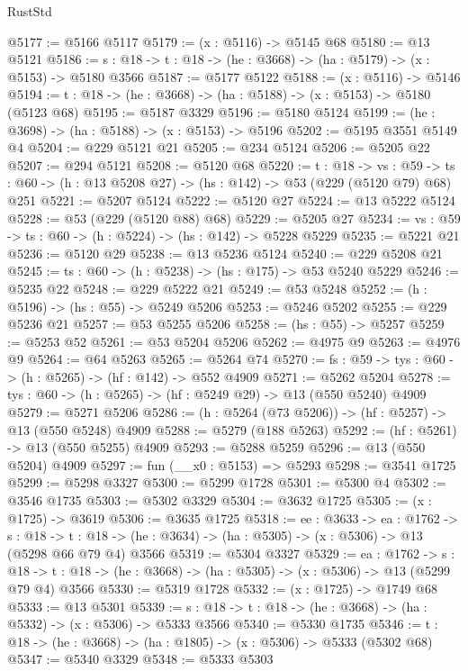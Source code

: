 \begin{lexlean}{RustStd}
\begin{coremodule}
@5177 := @5166 @5117
@5179 := (x : @5116) -> @5145 @68
@5180 := @13 @5121
@5186 := {s : @18} -> {t : @18} -> (he : @3668) -> (ha : @5179) -> (x : @5153) -> @5180 @3566
@5187 := @5177 @5122
@5188 := (x : @5116) -> @5146
@5194 := {t : @18} -> (he : @3668) -> (ha : @5188) -> (x : @5153) -> @5180 (@5123 @68)
@5195 := @5187 @3329
@5196 := @5180 @5124
@5199 := (he : @3698) -> (ha : @5188) -> (x : @5153) -> @5196
@5202 := @5195 @3551 @5149 @4
@5204 := @229 @5121 @21
@5205 := @234 @5124
@5206 := @5205 @22
@5207 := @294 @5121
@5208 := @5120 @68
@5220 := {t : @18} ->
  {vs : @59} -> {ts : @60} -> (h : @13 @5208 @27) -> (hs : @142) -> @53 (@229 (@5120 @79) @68) @251
@5221 := @5207 @5124
@5222 := @5120 @27
@5224 := @13 @5222 @5124
@5228 := @53 (@229 (@5120 @88) @68)
@5229 := @5205 @27
@5234 := {vs : @59} -> {ts : @60} -> (h : @5224) -> (hs : @142) -> @5228 @5229
@5235 := @5221 @21
@5236 := @5120 @29
@5238 := @13 @5236 @5124
@5240 := @229 @5208 @21
@5245 := {ts : @60} -> (h : @5238) -> (hs : @175) -> @53 @5240 @5229
@5246 := @5235 @22
@5248 := @229 @5222 @21
@5249 := @53 @5248
@5252 := (h : @5196) -> (hs : @55) -> @5249 @5206
@5253 := @5246 @5202
@5255 := @229 @5236 @21
@5257 := @53 @5255 @5206
@5258 := (hs : @55) -> @5257
@5259 := @5253 @52
@5261 := @53 @5204 @5206
@5262 := @4975 @9
@5263 := @4976 @9
@5264 := @64 @5263
@5265 := @5264 @74
@5270 := {fs : @59} -> {tys : @60} -> (h : @5265) -> (hf : @142) -> @552 @4909
@5271 := @5262 @5204
@5278 := {tys : @60} -> (h : @5265) -> (hf : @5249 @29) -> @13 (@550 @5240) @4909
@5279 := @5271 @5206
@5286 := (h : @5264 (@73 @5206)) -> (hf : @5257) -> @13 (@550 @5248) @4909
@5288 := @5279 (@188 @5263)
@5292 := (hf : @5261) -> @13 (@550 @5255) @4909
@5293 := @5288 @5259
@5296 := @13 (@550 @5204) @4909
@5297 := fun (__x0 : @5153) => @5293
@5298 := @3541 @1725
@5299 := @5298 @3327
@5300 := @5299 @1728
@5301 := @5300 @4
@5302 := @3546 @1735
@5303 := @5302 @3329
@5304 := @3632 @1725
@5305 := (x : @1725) -> @3619
@5306 := @3635 @1725
@5318 := {ee : @3633} ->
  {ea : @1762} ->
  {s : @18} ->
  {t : @18} -> (he : @3634) -> (ha : @5305) -> (x : @5306) -> @13 (@5298 @66 @79 @4) @3566
@5319 := @5304 @3327
@5329 := {ea : @1762} ->
  {s : @18} -> {t : @18} -> (he : @3668) -> (ha : @5305) -> (x : @5306) -> @13 (@5299 @79 @4) @3566
@5330 := @5319 @1728
@5332 := (x : @1725) -> @1749 @68
@5333 := @13 @5301
@5339 := {s : @18} -> {t : @18} -> (he : @3668) -> (ha : @5332) -> (x : @5306) -> @5333 @3566
@5340 := @5330 @1735
@5346 := {t : @18} -> (he : @3668) -> (ha : @1805) -> (x : @5306) -> @5333 (@5302 @68)
@5347 := @5340 @3329
@5348 := @5333 @5303

\end{coremodule}
\end{lexlean}
